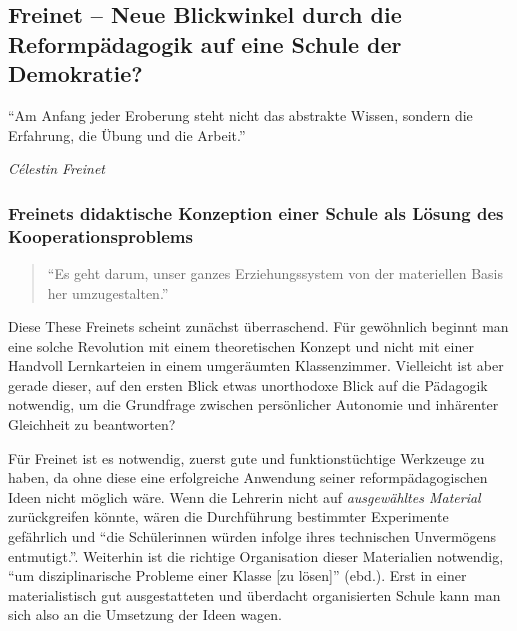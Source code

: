 \subsection[Freinet]{Freinet -- Neue Blickwinkel durch die Reformpädagogik auf eine Schule der Demokratie?}

	\epigraph{
		``Am Anfang jeder Eroberung steht nicht das abstrakte Wissen, sondern die Erfahrung, die Übung und die Arbeit.''}
	{
		\emph{Célestin Freinet}
	}

\subsubsection{Freinets didaktische Konzeption einer Schule als Lösung des Kooperationsproblems}

\begin{quote}
	``Es geht darum, unser ganzes Erziehungssystem von der materiellen Basis her umzugestalten.''
	\cite[S.~99]{Freinet1979}
\end{quote}

Diese These Freinets scheint zunächst überraschend.
Für gewöhnlich beginnt man eine solche Revolution mit einem theoretischen Konzept und nicht mit einer Handvoll Lernkarteien in einem umgeräumten Klassenzimmer.
Vielleicht ist aber gerade dieser, auf den ersten Blick etwas unorthodoxe Blick auf die Pädagogik notwendig, um die Grundfrage zwischen persönlicher Autonomie und inhärenter Gleichheit zu beantworten?

Für Freinet ist es notwendig, zuerst gute und funktionstüchtige Werkzeuge zu haben, da ohne diese eine erfolgreiche Anwendung seiner reformpädagogischen Ideen nicht möglich wäre.
Wenn die Lehrerin nicht auf \emph{ausgewähltes Material} zurückgreifen könnte, wären die Durchführung bestimmter Experimente gefährlich und ``die Schülerinnen würden infolge ihres technischen Unvermögens entmutigt.''\parencite[S.~98]{Freinet1979}.
Weiterhin ist die richtige Organisation dieser Materialien notwendig, ``um disziplinarische Probleme einer Klasse [zu lösen]'' (ebd.).
Erst in einer materialistisch gut ausgestatteten und überdacht organisierten Schule kann man sich also an die Umsetzung der Ideen wagen.

